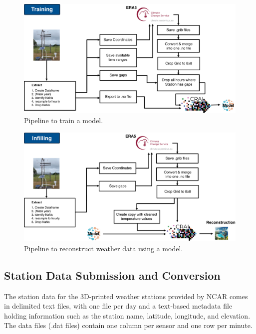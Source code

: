 \begin{figure}
    \centering
    \includegraphics[width=450pt]{resources/images/training_pipeline.png}
    \caption{Pipeline to train a model.}
    \label{fig: training_pipeline}
\end{figure}

\begin{figure}
    \centering
    \includegraphics[width=450pt]{resources/images/infilling_pipeline.png}
    \caption{Pipeline to reconstruct weather data using a model.}
    \label{fig: infilling_pipeline}
\end{figure}

\subsection{Station Data Submission and Conversion}

The station data for the 3D-printed weather stations provided by NCAR comes in delimited text files, with one file per day and a text-based metadata file holding information such as the station name, latitude, longitude, and elevation. 
The data files (.dat files) contain one column per sensor and one row per minute.

